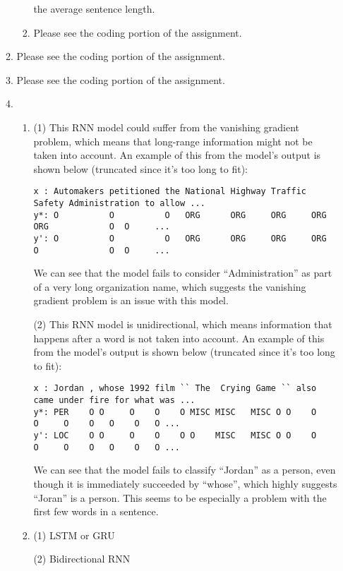 \documentclass[10pt,reqno]{amsart}
\begin{document}
\begin{enumerate}[topsep=0pt,itemsep=3ex,partopsep=1ex,parsep=1ex]
\begin{enumerate}[itemsep=2ex]
\begin{enumerate}[itemsep=2ex]
        the average sentence length. 
      \item Please see the coding portion of the assignment.
    \end{enumerate}
  \item Please see the coding portion of the assignment.
  \item Please see the coding portion of the assignment.
  \item 
    \begin{enumerate}[itemsep=2ex]
      \item 
        (1) This RNN model could suffer from the vanishing gradient problem, which means that long-range information 
        might not be taken into account. An example of this from the model's output is shown below
        (truncated since it's too long to fit):
        \begin{verbatim}
x : Automakers petitioned the National Highway Traffic Safety Administration to allow ...
y*: O          O          O   ORG      ORG     ORG     ORG    ORG            O  O     ...
y': O          O          O   ORG      ORG     ORG     ORG    O              O  O     ...
        \end{verbatim}
        We can see that the model fails to consider ``Administration'' as part of a very long organization name, 
        which suggests the vanishing gradient problem is an issue with this model.
        
        (2) This RNN model is unidirectional, which means information that happens after a word is not 
        taken into account. An example of this from the model's output is shown below
        (truncated since it's too long to fit):
        \begin{verbatim}
x : Jordan , whose 1992 film `` The  Crying Game `` also came under fire for what was ...
y*: PER    O O     O    O    O MISC MISC   MISC O O    O    O     O    O   O    O   O ...
y': LOC    O O     O    O    O O    MISC   MISC O O    O    O     O    O   O    O   O ...
        \end{verbatim}
        We can see that the model fails to classify ``Jordan'' as a person, even though it is immediately 
        succeeded by ``whose'', which highly suggests ``Joran'' is a person. This seems to be especially a 
        problem with the first few words in a sentence. 
      \item
        (1) LSTM or GRU

        (2) Bidirectional RNN
    \end{enumerate}
  \end{enumerate}



\end{enumerate}
\end{document}

